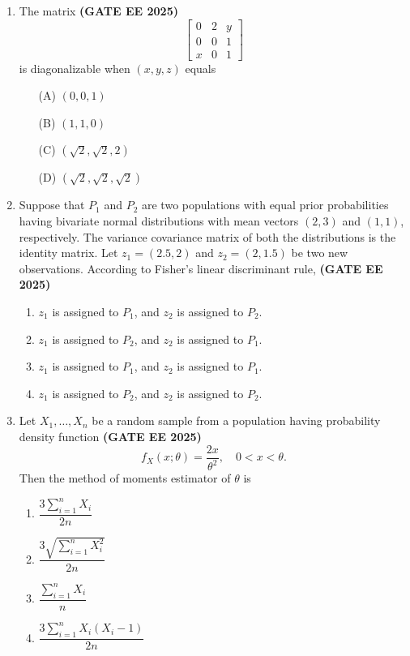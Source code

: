 \documentclass[journal,12pt,onecolumn]{IEEEtran}
\theoremstyle{remark}
\begin{document}
\begin{enumerate}
\item The matrix \hfill \textbf{(GATE EE 2025)}\\
\[
\begin{bmatrix}
0 & 2 & y \\
0 & 0 & 1 \\
x & 0 & 1 
\end{bmatrix}
\]
is diagonalizable when $(x,y,z)$ equals
\begin{enumerate}
    \item[(A)] $(0,0,1)$
    \item[(B)] $(1,1,0)$
    \item[(C)] $(\sqrt{2},\sqrt{2},2)$
    \item[(D)] $(\sqrt{2},\sqrt{2},\sqrt{2})$
\end{enumerate}


\item Suppose that $P_1$ and $P_2$ are two populations with equal prior probabilities having bivariate normal distributions with mean vectors $(2,3)$ and $(1,1)$, respectively. The variance covariance matrix of both the distributions is the identity matrix. Let $z_1 = (2.5,2)$ and $z_2 = (2,1.5)$ be two new observations. According to Fisher's linear discriminant rule, \hfill \textbf{(GATE EE 2025)}\\

\begin{enumerate}
    \item $z_1$ is assigned to $P_1$, and $z_2$ is assigned to $P_2$.
    \item $z_1$ is assigned to $P_2$, and $z_2$ is assigned to $P_1$.
    \item $z_1$ is assigned to $P_1$, and $z_2$ is assigned to $P_1$.
    \item $z_1$ is assigned to $P_2$, and $z_2$ is assigned to $P_2$.
\end{enumerate}

\item Let $X_1,\dots,X_n$ be a random sample from a population having probability density function \hfill \textbf{(GATE EE 2025)}\\
\[
f_X(x;\theta) = \frac{2x}{\theta^2}, \quad 0 < x < \theta.
\]
Then the method of moments estimator of $\theta$ is
\begin{enumerate}
    \item $\dfrac{3 \sum_{i=1}^n X_i}{2n}$
    \item $\dfrac{3 \sqrt{\sum_{i=1}^n X_i^2}}{2n}$
    \item $\dfrac{\sum_{i=1}^n X_i}{n}$
    \item $\dfrac{3 \sum_{i=1}^n X_i (X_i-1)}{2n}$
\end{enumerate}


\end{enumerate}
\end{document}
